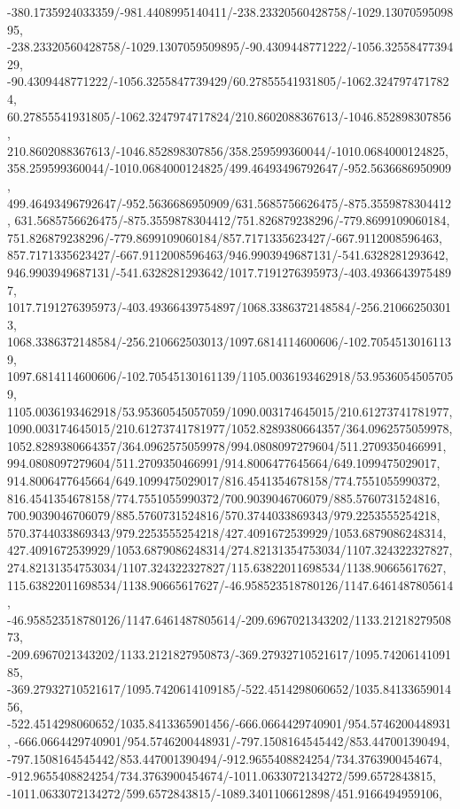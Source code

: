 {    -380.1735924033359/-981.4408995140411/-238.23320560428758/-1029.1307059509895,
    -238.23320560428758/-1029.1307059509895/-90.4309448771222/-1056.3255847739429,
    -90.4309448771222/-1056.3255847739429/60.27855541931805/-1062.3247974717824,
    60.27855541931805/-1062.3247974717824/210.8602088367613/-1046.852898307856,
    210.8602088367613/-1046.852898307856/358.259599360044/-1010.0684000124825,
    358.259599360044/-1010.0684000124825/499.46493496792647/-952.5636686950909,
    499.46493496792647/-952.5636686950909/631.5685756626475/-875.3559878304412,
    631.5685756626475/-875.3559878304412/751.826879238296/-779.8699109060184,
    751.826879238296/-779.8699109060184/857.7171335623427/-667.9112008596463,
    857.7171335623427/-667.9112008596463/946.9903949687131/-541.6328281293642,
    946.9903949687131/-541.6328281293642/1017.7191276395973/-403.49366439754897,
    1017.7191276395973/-403.49366439754897/1068.3386372148584/-256.210662503013,
    1068.3386372148584/-256.210662503013/1097.6814114600606/-102.70545130161139,
    1097.6814114600606/-102.70545130161139/1105.0036193462918/53.95360545057059,
    1105.0036193462918/53.95360545057059/1090.003174645015/210.61273741781977,
    1090.003174645015/210.61273741781977/1052.8289380664357/364.0962575059978,
    1052.8289380664357/364.0962575059978/994.0808097279604/511.2709350466991,
    994.0808097279604/511.2709350466991/914.8006477645664/649.1099475029017,
    914.8006477645664/649.1099475029017/816.4541354678158/774.7551055990372,
    816.4541354678158/774.7551055990372/700.9039046706079/885.5760731524816,
    700.9039046706079/885.5760731524816/570.3744033869343/979.2253555254218,
    570.3744033869343/979.2253555254218/427.4091672539929/1053.6879086248314,
    427.4091672539929/1053.6879086248314/274.82131354753034/1107.324322327827,
    274.82131354753034/1107.324322327827/115.63822011698534/1138.90665617627,
    115.63822011698534/1138.90665617627/-46.958523518780126/1147.6461487805614,
    -46.958523518780126/1147.6461487805614/-209.6967021343202/1133.2121827950873,
    -209.6967021343202/1133.2121827950873/-369.27932710521617/1095.7420614109185,
    -369.27932710521617/1095.7420614109185/-522.4514298060652/1035.8413365901456,
    -522.4514298060652/1035.8413365901456/-666.0664429740901/954.5746200448931,
    -666.0664429740901/954.5746200448931/-797.1508164545442/853.447001390494,
    -797.1508164545442/853.447001390494/-912.9655408824254/734.3763900454674,
    -912.9655408824254/734.3763900454674/-1011.0633072134272/599.6572843815,
    -1011.0633072134272/599.6572843815/-1089.3401106612898/451.9166494959106,
}
